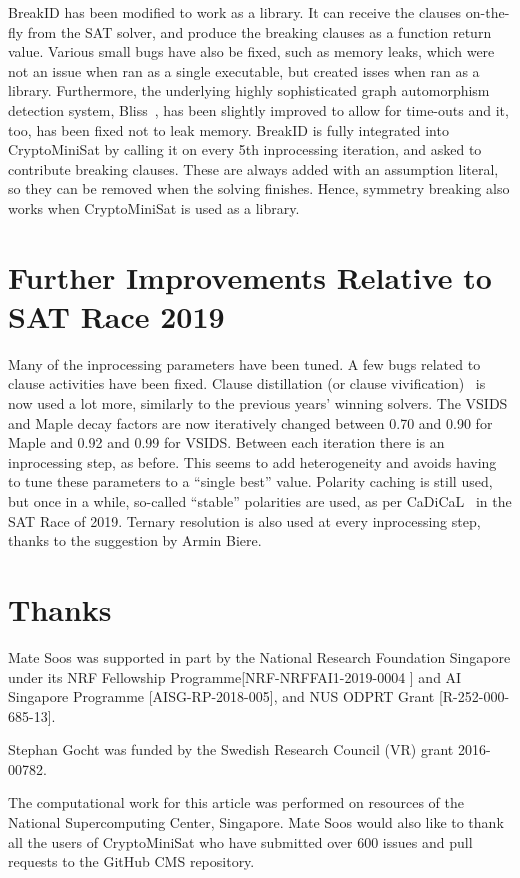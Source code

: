 \documentclass[final]{ieee}
\begin{document}
BreakID has been modified to work as a library. It can receive the clauses on-the-fly from the SAT solver, and produce the breaking clauses as a function return value. Various small bugs have also be fixed, such as memory leaks, which were not an issue when ran as a single executable, but created isses when ran as a library. Furthermore, the underlying highly sophisticated graph automorphism detection system, Bliss~\cite{DBLP:conf/alenex/JunttilaK07}, has been slightly improved to allow for time-outs and it, too, has been fixed not to leak memory. BreakID is fully integrated into CryptoMiniSat by calling it on every 5th inprocessing iteration, and asked to contribute breaking clauses. These are always added with an assumption literal, so they can be removed when the solving finishes. Hence, symmetry breaking also works when CryptoMiniSat is used as a library.


\section{Further Improvements Relative to SAT Race 2019}
Many of the inprocessing parameters have been tuned. A few bugs related to clause activities have been fixed. Clause distillation (or clause vivification)~\cite{DBLP:journals/ai/LiXLMLL20} is now used a lot more, similarly to the previous years' winning solvers. The VSIDS and Maple decay factors are now iteratively changed between 0.70 and 0.90 for Maple and 0.92 and 0.99 for VSIDS. Between each iteration there is an inprocessing step, as before. This seems to add heterogeneity and avoids having to tune these parameters to a ``single best'' value. Polarity caching is still used, but once in a while, so-called ``stable'' polarities are used, as per CaDiCaL~\cite{cadical} in the SAT Race of 2019. Ternary resolution is also used at every inprocessing step, thanks to the suggestion by Armin Biere.


\section{Thanks}
Mate Soos was supported in part by the National Research Foundation Singapore under its NRF Fellowship Programme[NRF-NRFFAI1-2019-0004 ] and AI Singapore Programme [AISG-RP-2018-005],  and NUS ODPRT Grant [R-252-000-685-13].

Stephan Gocht was funded by the Swedish Research Council (VR) grant \mbox{2016-00782}.

The computational work for this article was performed on resources of the National Supercomputing Center, Singapore\cite{nscc}. Mate Soos would also like to thank all the users of CryptoMiniSat who have submitted over 600 issues and pull requests to the GitHub CMS repository\cite{CMS}.




\vfill
\pagebreak
\end{document}
